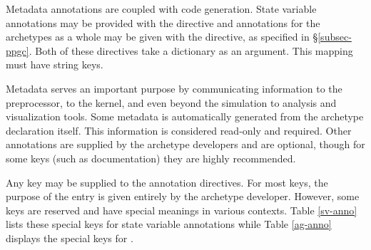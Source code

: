 Metadata annotations are coupled with code generation.  State variable annotations
may be provided with the  directive and annotations for 
the archetypes as a whole may be given with the  directive,
as specified in \S \ref{subsec-ppgc}. Both of these directives take a dictionary 
as an argument. This mapping must have string keys.

Metadata serves an important purpose by communicating information to the \cyclus
preprocessor, to the \cyclus kernel, and even beyond the simulation to analysis 
and visualization tools. Some metadata is automatically generated from the 
archetype declaration itself.  This information is considered read-only and required. 
Other annotations are supplied by the archetype developers and are optional, 
though for some keys (such as documentation) they are highly recommended.

Any key may be supplied to the annotation directives. For most keys, the 
purpose of the entry is given entirely by the archetype developer. However, 
some keys are reserved and have special meanings in various contexts. Table
\ref{sv-anno} lists these special keys for state variable annotations while Table
\ref{ag-anno} displays the special keys for .

